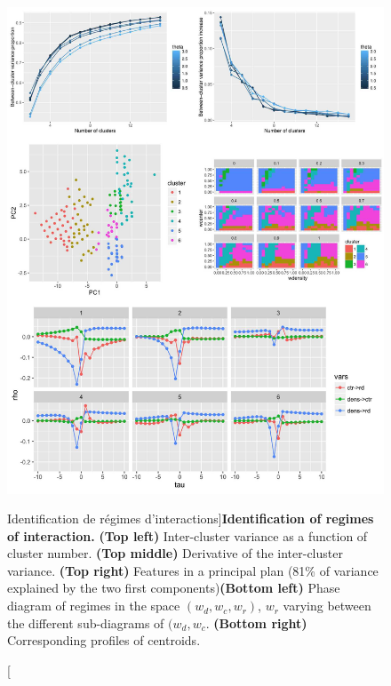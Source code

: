 \begin{figure}
\includegraphics[width=\linewidth]{Figures/Final/4-2-2-fig-causalityregimes-clustering.jpg}
\caption[Identification of interaction regimes][Identification de régimes d'interactions]{\textbf{Identification of regimes of interaction.} \textbf{(Top left)} Inter-cluster variance as a function of cluster number. \textbf{(Top middle)} Derivative of the inter-cluster variance. \textbf{(Top right)} Features in a principal plan (81\% of variance explained by the two first components)\textbf{(Bottom left)} Phase diagram of regimes in the space $(w_{d},w_{c},w_{r})$, $w_r$ varying between the different sub-diagrams of $(w_{d},w_{c}$. \textbf{(Bottom right)} Corresponding profiles of centroids.\label{fig:causalityregimes:clustering}}


\end{figure}
